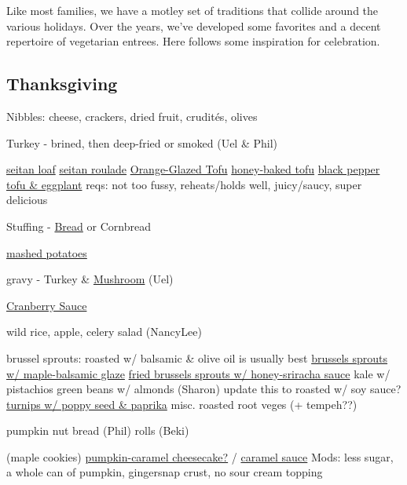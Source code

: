 Like most families, we have a motley set of traditions that collide around the various holidays. Over the years, we've developed some favorites and a decent repertoire of vegetarian entrees. Here follows some inspiration for celebration.

\subsection{Thanksgiving}
Nibbles: cheese, crackers, dried fruit, crudités, olives

Turkey - brined, then deep-fried or smoked (Uel \& Phil)

\href{http://www.theppk.com/2011/11/seitan-roast-stuffed-with-shiitakes-and-leeks/}{seitan loaf}
\href{https://olivesfordinner.com/2011/11/seitan-roulade-with-sage-and-swee.html}{seitan roulade}
\hyperref[Orange-Glazed Tofu]{Orange-Glazed Tofu}
\href{https://www.theppk.com/2016/12/sweet-smoky-glazed-tofu-ham/}{honey-baked tofu}
\href{https://smittenkitchen.com/2019/08/black-pepper-tofu-and-eggplant/}{black pepper tofu \& eggplant}
reqs: not too fussy, reheats/holds well, juicy/saucy, super delicious

Stuffing - \hyperref[Bread Stuffing]{Bread} or Cornbread

\href{https://www.foodnetwork.com/recipes/alton-brown/creamy-mashed-potatoes-recipe-1956220}{mashed potatoes}

gravy - Turkey \& \href{https://www.kitchentreaty.com/vegetarian-onion-gravy/}{Mushroom} (Uel)

\hyperref[Cranberry Sauce]{Cranberry Sauce}

wild rice, apple, celery salad (NancyLee)

brussel sprouts: roasted w/ balsamic \& olive oil is usually best
\href{http://www.seriouseats.com/recipes/2012/11/roasted-brussels-sprouts-bacon-pecans-maple-balsamic-recipe.html}{brussels sprouts w/ maple-balsamic glaze}
\href{https://thepioneerwoman.com/food-and-friends/crispy-fried-brussels-sprouts/}{fried brussels sprouts w/ honey-sriracha sauce}
kale w/ pistachios
green beans w/ almonds (Sharon)
update this to roasted w/ soy sauce?
\href{http://www.foodnetwork.com/recipes/mario-batali/roasted-turnips-recipe.html}{turnips w/ poppy seed \& paprika}
misc. roasted root veges (+ tempeh??)

pumpkin nut bread (Phil)
rolls (Beki)

(maple cookies)
\href{http://smittenkitchen.com/blog/2006/11/candy-corn-for-really-lucky-grown-ups/}{pumpkin-caramel cheesecake?} / \href{http://smittenkitchen.com/blog/2008/10/paris-a-deep-dark-salted-butter-caramel-sauce/}{caramel sauce}
Mods: less sugar, a whole can of pumpkin, gingersnap crust, no sour cream topping

